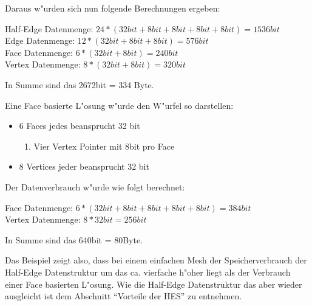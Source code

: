 \documentclass[pagesize, paper=a4, fontsize=12pt,titlepage=true, headings=small, headnosepline, abstractoff, liststotoc, nochapterprefix, plainheadsepline]{scrreprt}
\newcommand{\HES}{Half-Edge Datenstruktur }
\begin{document}
Daraus w"urden sich nun folgende Berechnungen ergeben:

	Half-Edge Datenmenge: \begin{math}24 * (32bit+ 8bit + 8bit + 8bit + 8bit) = 1536bit\end{math}
	\\
	Edge Datenmenge: \begin{math}12 * (32bit + 8bit + 8bit) = 576bit\end{math}
	\\
	Face Datenmenge: \begin{math}6 * (32bit + 8bit) = 240bit\end{math}
	\\
	Vertex Datenmenge: \begin{math}8 * (32bit + 8bit) = 320bit\end{math}

	In Summe sind das 2672bit = 334 Byte.
\newline

Eine Face basierte L"osung w"urde den W"urfel so darstellen:
\begin{itemize}
\item 6 Faces jedes beansprucht 32 bit
	\begin{enumerate}
    	\item Vier Vertex Pointer mit 8bit pro Face
	\end{enumerate}
\item 8 Vertices jeder beansprucht 32 bit
\end{itemize}

Der Datenverbrauch w"urde wie folgt berechnet:

	Face Datenmenge: \begin{math}6 * (32bit + 8bit + 8bit + 8bit + 8bit) = 384bit\end{math}
	\\
	Vertex Datenmenge: \begin{math}8 * 32bit = 256bit\end{math}

	In Summe sind das 640bit = 80Byte.
\newline

Das Beispiel zeigt also, dass bei einem einfachen Mesh der Speicherverbrauch der \HES um das ca. vierfache h"oher liegt als der Verbrauch einer Face basierten L"osung. Wie die \HES das aber wieder ausgleicht ist dem Abschnitt "`Vorteile der HES"' zu entnehmen.
\end{document}
